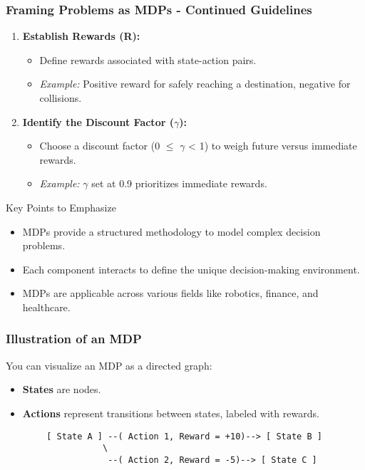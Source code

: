 \documentclass{beamer}
\begin{document}
\begin{frame}[fragile]
    \frametitle{Framing Problems as MDPs - Continued Guidelines}
    \begin{enumerate}[resume]
        \item \textbf{Establish Rewards (R):}
            \begin{itemize}
                \item Define rewards associated with state-action pairs.
                \item \textit{Example:} Positive reward for safely reaching a destination, negative for collisions.
            \end{itemize}

        \item \textbf{Identify the Discount Factor ($\gamma$):}
            \begin{itemize}
                \item Choose a discount factor (0 $\leq$ $\gamma$ < 1) to weigh future versus immediate rewards.
                \item \textit{Example:} $\gamma$ set at 0.9 prioritizes immediate rewards.
            \end{itemize}
    \end{enumerate}

    \begin{block}{Key Points to Emphasize}
        \begin{itemize}
            \item MDPs provide a structured methodology to model complex decision problems.
            \item Each component interacts to define the unique decision-making environment.
            \item MDPs are applicable across various fields like robotics, finance, and healthcare.
        \end{itemize}
    \end{block}
\end{frame}

\begin{frame}[fragile]
    \frametitle{Illustration of an MDP}
    You can visualize an MDP as a directed graph:
    \begin{itemize}
        \item \textbf{States} are nodes.
        \item \textbf{Actions} represent transitions between states, labeled with rewards.
    \end{itemize}

    \begin{center}
        \begin{verbatim}
        [ State A ] --( Action 1, Reward = +10)--> [ State B ]
                   \
                    --( Action 2, Reward = -5)--> [ State C ]
        \end{verbatim}
    \end{center}
\end{frame}
\end{document}
